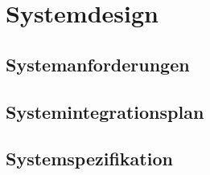 \chapter{Systemdesign}
\section{Systemanforderungen}
\section{Systemintegrationsplan}
\section{Systemspezifikation}